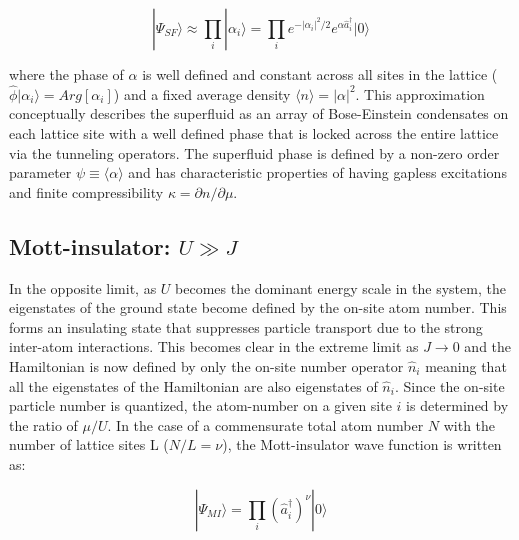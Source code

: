 \begin{equation}
\label{eqn:SFcoh}
|\Psi_{SF} \rangle \approx \prod_i |\alpha_i\rangle = \prod_i e^{- |\alpha_i |^2 /2} e^{\alpha \hat{a}^\dagger_i} |0\rangle
\end{equation}

where the phase of $\alpha$ is well defined and constant across all sites in the lattice ($\hat{\phi} |\alpha_i\rangle = Arg[\alpha_i]$) and a fixed average density $\langle n \rangle = | \alpha |^2 $. This approximation conceptually describes the superfluid as an array of Bose-Einstein condensates on each lattice site with a well defined phase that is locked across the entire lattice via the tunneling operators. The superfluid phase is defined by a non-zero order parameter $\psi \equiv \langle \alpha \rangle$ and has characteristic properties of having gapless excitations and finite compressibility $\kappa = \partial n/\partial \mu$.

\subsection{Mott-insulator: $U \gg J$}

In the opposite limit, as $U$ becomes the dominant energy scale in the system, the eigenstates of the ground state become defined by the on-site atom number. This forms an insulating state that suppresses particle transport due to the strong inter-atom interactions. This becomes clear in the extreme limit as $J\rightarrow 0$ and the Hamiltonian is now defined by only the on-site number operator $\hat{n}_i$ meaning that all the eigenstates of the Hamiltonian are also eigenstates of $\hat{n}_i$. Since the on-site particle number is quantized, the atom-number on a given site $i$ is determined by the ratio of $\mu/U$. In the case of a commensurate total atom number $N$ with the number of lattice sites L ($N/L=\nu$), the Mott-insulator wave function is written as:

\begin{equation}
\label{eqn:MI}
|\Psi_{MI}\rangle = \prod_i \left ( \hat{a}_i^\dagger \right )^\nu |0\rangle
\end{equation}

